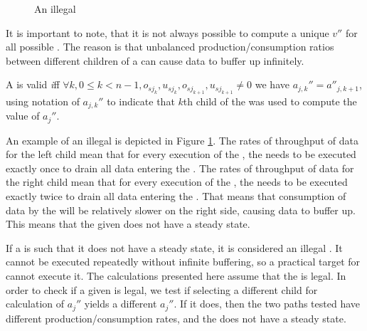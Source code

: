 \begin{figure}\begin{center}
\begin{minipage}{1in}
\centering {}
\end{minipage}
\end{center}
\caption{An illegal {\splitjoin}} \label{fig:splitjoin-illegal}
\end{figure}

It is important to note, that it is not always possible to compute
a unique $v''$ for all possible {\splitjoins}. The reason is that
unbalanced production/consumption ratios between different
children of a {\splitjoin} can cause data to buffer up infinitely.

\begin{definition} A {\splitjoin} is valid
{\emph iff} $\forall k, 0 \le k < n-1, o_{sj_k}, u_{sj_k},
o_{sj_{k+1}}, u_{sj_{k+1}} \ne 0$ we have $a_{j,k}'' =
a''_{j,k+1}$, using notation of $a_{j,k}''$ to indicate that $k$th
child of the {\splitjoin} was used to compute the value of
$a_j''$.
\end{definition}

An example of an illegal {\splitjoin} is depicted in Figure
\ref{fig:splitjoin-illegal}.  The rates of throughput of data for
the left child mean that for every execution of the {\splitter},
the {\joiner} needs to be executed exactly once to drain all data
entering the {\splitjoin}.  The rates of throughput of data for
the right child mean that for every execution of the {\splitter},
the {\joiner} needs to be executed exactly twice to drain all data
entering the {\splitjoin}. That means that consumption of data by
the {\joiner} will be relatively slower on the right side, causing
data to buffer up. This means that the given {\splitjoin} does not
have a steady state.

If a {\splitjoin} is such that it does not have a steady state, it
is considered an illegal {\splitjoin}.  It cannot be executed
repeatedly without infinite buffering, so a practical target for
{\StreamIt} cannot execute it.  The calculations presented here
assume that the {\splitjoin} is legal.  In order to check if a
given {\splitjoin} is legal, we test if selecting a different
child for calculation of $a_j''$ yields a different $a_j''$. If it
does, then the two paths tested have different
production/consumption rates, and the {\splitjoin} does not have a
steady state.

\subsection{\feedbackloop}

